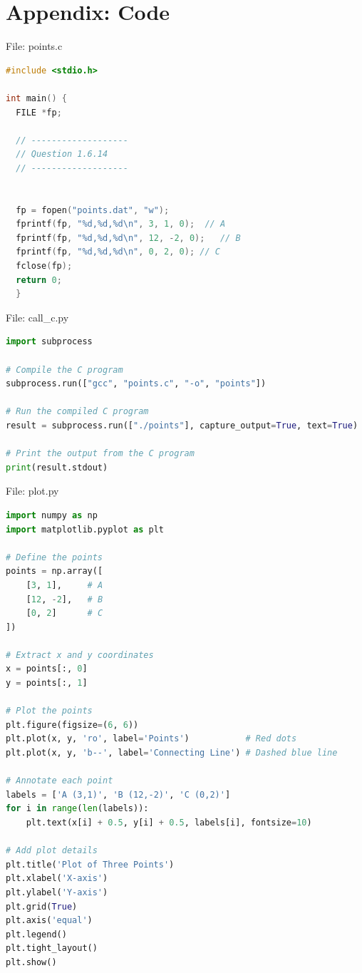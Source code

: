 \documentclass{beamer}
\numberwithin{equation}{section}
\theoremstyle{remark}
\begin{document}
\section*{Appendix: Code}

\begin{frame}[fragile]{File: points.c}
\begin{lstlisting}[language=C]
#include <stdio.h>

int main() {
  FILE *fp;

  // -------------------
  // Question 1.6.14
  // -------------------


  fp = fopen("points.dat", "w");
  fprintf(fp, "%d,%d,%d\n", 3, 1, 0);  // A
  fprintf(fp, "%d,%d,%d\n", 12, -2, 0);   // B
  fprintf(fp, "%d,%d,%d\n", 0, 2, 0); // C
  fclose(fp);
  return 0;
  }
\end{lstlisting}
\end{frame}

\begin{frame}[fragile]{File: call\_c.py}
\begin{lstlisting}[language=Python]
import subprocess

# Compile the C program
subprocess.run(["gcc", "points.c", "-o", "points"])

# Run the compiled C program
result = subprocess.run(["./points"], capture_output=True, text=True)

# Print the output from the C program
print(result.stdout)
\end{lstlisting}
\end{frame}

\begin{frame}[fragile]{File: plot.py}
\begin{lstlisting}[language=Python]
import numpy as np
import matplotlib.pyplot as plt

# Define the points
points = np.array([
    [3, 1],     # A
    [12, -2],   # B
    [0, 2]      # C
])

# Extract x and y coordinates
x = points[:, 0]
y = points[:, 1]

# Plot the points
plt.figure(figsize=(6, 6))
plt.plot(x, y, 'ro', label='Points')           # Red dots
plt.plot(x, y, 'b--', label='Connecting Line') # Dashed blue line

# Annotate each point
labels = ['A (3,1)', 'B (12,-2)', 'C (0,2)']
for i in range(len(labels)):
    plt.text(x[i] + 0.5, y[i] + 0.5, labels[i], fontsize=10)

# Add plot details
plt.title('Plot of Three Points')
plt.xlabel('X-axis')
plt.ylabel('Y-axis')
plt.grid(True)
plt.axis('equal')
plt.legend()
plt.tight_layout()
plt.show()
\end{lstlisting}
\end{frame}
\end{document}

